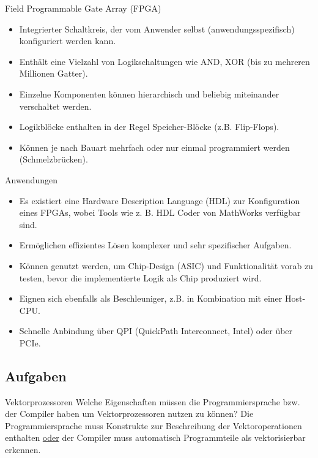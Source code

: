 \begin{defi}{Field Programmable Gate Array (FPGA)}
    \begin{itemize}
        \item Integrierter Schaltkreis, der vom Anwender selbst (anwendungsspezifisch) konfiguriert werden kann.
        \item Enthält eine Vielzahl von Logikschaltungen wie AND, XOR (bis zu mehreren Millionen Gatter).
        \item Einzelne Komponenten können hierarchisch und beliebig miteinander verschaltet werden.
        \item Logikblöcke enthalten in der Regel Speicher-Blöcke (z.B. Flip-Flops).
        \item Können je nach Bauart mehrfach oder nur einmal programmiert werden (Schmelzbrücken).
    \end{itemize}
\end{defi}

\begin{defi}{Anwendungen}
    \begin{itemize}
        \item Es existiert eine Hardware Description Language (HDL) zur Konfiguration eines FPGAs, wobei Tools wie z. B. HDL Coder von MathWorks verfügbar sind.
        \item Ermöglichen effizientes Lösen komplexer und sehr spezifischer Aufgaben.
        \item Können genutzt werden, um Chip-Design (ASIC) und Funktionalität vorab zu testen, bevor die implementierte Logik als Chip produziert wird.
        \item Eignen sich ebenfalls als Beschleuniger, z.B. in Kombination mit einer Host-CPU.
        \item Schnelle Anbindung über QPI (QuickPath Interconnect, Intel) oder über PCIe.
    \end{itemize}
\end{defi}

\subsection{Aufgaben}

\begin{aufgabe}{Vektorprozessoren}
    Welche Eigenschaften müssen die Programmiersprache bzw. der Compiler haben um Vektorprozessoren nutzen zu können?
\tcblower
    Die Programmiersprache muss Konstrukte zur Beschreibung der Vektoroperationen enthalten
    \underline{oder} der Compiler muss automatisch Programmteile als vektorisierbar erkennen.
\end{aufgabe}

